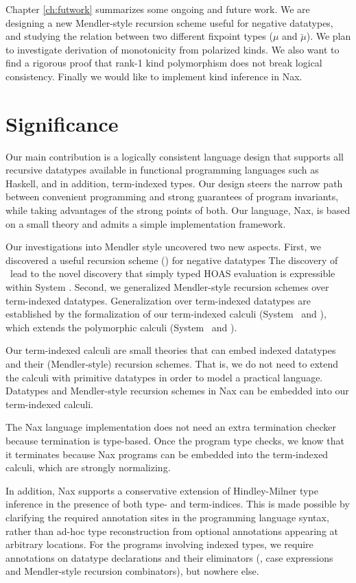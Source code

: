 Chapter \ref{ch:futwork} summarizes some ongoing and future work.
We are designing a new Mendler-style recursion scheme useful
for negative datatypes, and studying the relation between two different
fixpoint types ($\mu$ and $\breve\mu$). We plan to investigate derivation of
monotonicity from polarized kinds. We also want to find a rigorous proof 
that rank-1 kind polymorphism does not break logical consistency.
Finally we would like to implement kind inference in Nax.

\section{Significance}\label{sec:concl:sig}
Our main contribution is a logically consistent language design that supports
all recursive datatypes available in functional programming languages such as
Haskell, and in addition, term-indexed types. Our design steers the narrow
path between convenient programming and strong guarantees of program invariants,
while taking advantages of the strong points of both. Our language, Nax, is
based on a small theory and admits a simple implementation framework.

Our investigations into Mendler style uncovered two new aspects.
First, we discovered a useful recursion scheme (\MsfIt) for negative datatypes
The discovery of \MsfIt\ lead to the novel discovery that simply typed HOAS
evaluation is expressible within System \Fw. Second, we generalized
Mendler-style recursion schemes over term-indexed datatypes.
Generalization over term-indexed datatypes are established by
the formalization of our term-indexed calculi (System \Fi\ and \Fixi),
which extends the polymorphic calculi (System \Fw\ and \Fixw).

Our term-indexed calculi are small theories that can embed indexed datatypes
and their (Mendler-style) recursion schemes. That is, we do not need to extend
the calculi with primitive datatypes in order to model a practical language.
Datatypes and Mendler-style recursion schemes in Nax can be embedded into
our term-indexed calculi.

The Nax language implementation does not need an extra termination checker
because termination is type-based. Once the program type checks, we know
that it terminates because Nax programs can be embedded into
the term-indexed calculi, which are strongly normalizing.

In addition, Nax supports a conservative extension of Hindley-Milner
type inference in the presence of both type- and term-indices.
This is made possible by clarifying the required annotation sites
in the programming language syntax, rather than ad-hoc type reconstruction
from optional annotations appearing at arbitrary locations.
For the programs involving indexed types, we require annotations
on datatype declarations and their eliminators
(\ie, case expressions and Mendler-style recursion combinators),
but nowhere else.


